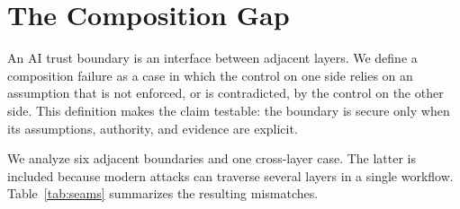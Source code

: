 \documentclass[runningheads]{llncs}
\begin{document}
\section{The Composition Gap}
\label{sec:seams}

An AI trust boundary is an interface between adjacent layers. We define a composition failure as a case in which the control on one side relies on an assumption that is not enforced, or is contradicted, by the control on the other side. This definition makes the claim testable: the boundary is secure only when its assumptions, authority, and evidence are explicit.

We analyze six adjacent boundaries and one cross-layer case. The latter is included because modern attacks can traverse several layers in a single workflow. Table~\ref{tab:seams} summarizes the resulting mismatches.
\end{document}
